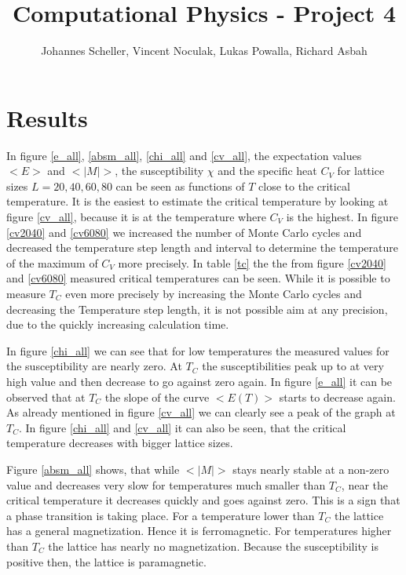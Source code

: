 \documentclass[10pt,a4paper]{article}
\author{Johannes Scheller, Vincent Noculak, Lukas Powalla, Richard Asbah}
\title{Computational Physics - Project 4}
\begin{document}
\maketitle
\newpage
\tableofcontents
\newpage


\section{Results}


In figure \ref{e_all}, \ref{absm_all}, \ref{chi_all} and \ref{cv_all}, the expectation values $<E>$ and $<|M|>$, the susceptibility $\chi$ and the specific heat $C_V$ for lattice sizes $L = 20, 40, 60, 80$ can be seen as functions of $T$ close to the critical temperature. It is the easiest to estimate the critical temperature by looking at figure \ref{cv_all}, because it is at the temperature where $C_V$ is the highest. In figure \ref{cv2040} and \ref{cv6080} we increased the number of Monte Carlo cycles and decreased the temperature step length and interval to determine the temperature of the maximum of $C_V$ more precisely. In table \ref{tc} the the from figure \ref{cv2040} and \ref{cv6080} measured critical temperatures can be seen. While it is possible to measure $T_C$ even more precisely by increasing the Monte Carlo cycles and decreasing the Temperature step length, it is not possible aim at any precision, due to the quickly increasing calculation time. 

In figure \ref{chi_all} we can see that for low temperatures the measured values for the susceptibility are nearly zero. At $T_C$ the susceptibilities peak up to at very high value and then decrease to go against zero again. In figure \ref{e_all} it can be observed that at $T_C$ the slope of the curve $<E(T)>$ starts to decrease again. As already mentioned in figure \ref{cv_all} we can clearly see a peak of the graph at $T_C$. In figure \ref{chi_all} and \ref{cv_all} it can also be seen, that the critical temperature decreases with bigger lattice sizes. 

Figure \ref{absm_all} shows, that while $<|M|>$ stays nearly stable at a non-zero value and decreases very slow for temperatures much smaller than $T_C$, near the critical temperature it decreases quickly and goes against zero. This is a sign that a phase transition is taking place. For a temperature lower than $T_C$ the lattice has a general magnetization. Hence it is ferromagnetic. For temperatures higher than $T_C$ the lattice has nearly no magnetization. Because the susceptibility is positive then, the  lattice is paramagnetic.
\end{document}

